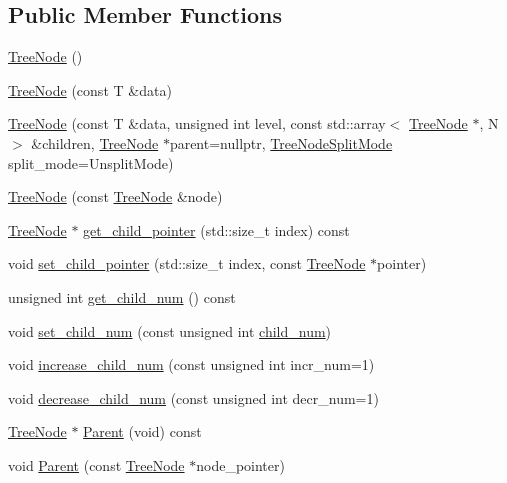 \subsection*{Public Member Functions}
\textbf{ }\par
\begin{DoxyCompactItemize}
\item 
\hyperlink{classTreeNode_a0cd82abd44bd197539bbd045aeef30d1}{Tree\+Node} ()
\item 
\hyperlink{classTreeNode_a6549fc1c54bafa84fb41c850f1d4586e}{Tree\+Node} (const T \&data)
\item 
\hyperlink{classTreeNode_ad5a724100f06f73f002007a2e433932c}{Tree\+Node} (const T \&data, unsigned int level, const std\+::array$<$ \hyperlink{classTreeNode}{Tree\+Node} $\ast$, N $>$ \&children, \hyperlink{classTreeNode}{Tree\+Node} $\ast$parent=nullptr, \hyperlink{tree_8h_a922ca07db9633957939f697a65aff11d}{Tree\+Node\+Split\+Mode} split\+\_\+mode=Unsplit\+Mode)
\item 
\hyperlink{classTreeNode_af05018d87f64710f41df36bfedd562f3}{Tree\+Node} (const \hyperlink{classTreeNode}{Tree\+Node} \&node)
\item 
\hyperlink{classTreeNode}{Tree\+Node} $\ast$ \hyperlink{classTreeNode_ad3b1833452c787d2146a4beb3587c531}{get\+\_\+child\+\_\+pointer} (std\+::size\+\_\+t index) const
\item 
void \hyperlink{classTreeNode_a3d2f374424a723cb72409857ee5237bc}{set\+\_\+child\+\_\+pointer} (std\+::size\+\_\+t index, const \hyperlink{classTreeNode}{Tree\+Node} $\ast$pointer)
\item 
unsigned int \hyperlink{classTreeNode_a077cb5cc974f94ff431c69cc2ca5957f}{get\+\_\+child\+\_\+num} () const
\item 
void \hyperlink{classTreeNode_a68c80783a2900d01a37fc33f14951e66}{set\+\_\+child\+\_\+num} (const unsigned int \hyperlink{classTreeNode_a9fc9333a3e4e05ae878a844370c17888}{child\+\_\+num})
\item 
void \hyperlink{classTreeNode_a1d471684d9c06b5721217fb55182bdeb}{increase\+\_\+child\+\_\+num} (const unsigned int incr\+\_\+num=1)
\item 
void \hyperlink{classTreeNode_a25426ded0c574843912b36216b30dc5e}{decrease\+\_\+child\+\_\+num} (const unsigned int decr\+\_\+num=1)
\item 
\hyperlink{classTreeNode}{Tree\+Node} $\ast$ \hyperlink{classTreeNode_a66c83bfefdb235d5cb4a299eb5044465}{Parent} (void) const
\item 
void \hyperlink{classTreeNode_a412b1980ecabb954901391b73332e657}{Parent} (const \hyperlink{classTreeNode}{Tree\+Node} $\ast$node\+\_\+pointer)

\end{DoxyCompactItemize}
